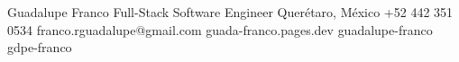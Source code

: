 \documentclass[10pt]{article}
\begin{document}
\pagestyle{empty}

\fontsize{9}{11.2}\selectfont


\makeheader
    {Guadalupe Franco}
    {Full-Stack Software Engineer}
    {Querétaro, México}
    {+52 442 351 0534}
    {franco.rguadalupe@gmail.com}
    {guada-franco.pages.dev}
    {guadalupe-franco}
    {gdpe-franco}





\vspace{-2pt}






\end{document}
